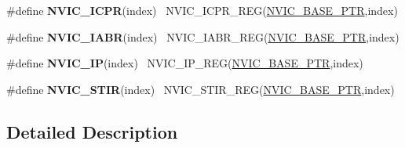 \begin{DoxyCompactItemize}
\item 
\hypertarget{group___n_v_i_c___register___accessor___macros_ga5a39e5d4659db96881c1f6de24ec47e5}{}\#define {\bfseries N\+V\+I\+C\+\_\+\+I\+C\+P\+R}(index)                                              ~N\+V\+I\+C\+\_\+\+I\+C\+P\+R\+\_\+\+R\+E\+G(\hyperlink{group___n_v_i_c___peripheral_ga28f0a055d0c218e16d1fc7b13ff0caa5}{N\+V\+I\+C\+\_\+\+B\+A\+S\+E\+\_\+\+P\+T\+R},index)\label{group___n_v_i_c___register___accessor___macros_ga5a39e5d4659db96881c1f6de24ec47e5}

\item 
\hypertarget{group___n_v_i_c___register___accessor___macros_gaf953d0f112753c05f951d7163e98e6fc}{}\#define {\bfseries N\+V\+I\+C\+\_\+\+I\+A\+B\+R}(index)                                              ~N\+V\+I\+C\+\_\+\+I\+A\+B\+R\+\_\+\+R\+E\+G(\hyperlink{group___n_v_i_c___peripheral_ga28f0a055d0c218e16d1fc7b13ff0caa5}{N\+V\+I\+C\+\_\+\+B\+A\+S\+E\+\_\+\+P\+T\+R},index)\label{group___n_v_i_c___register___accessor___macros_gaf953d0f112753c05f951d7163e98e6fc}

\item 
\hypertarget{group___n_v_i_c___register___accessor___macros_gad215e21e79fd6c4c0b310324a51b0a34}{}\#define {\bfseries N\+V\+I\+C\+\_\+\+I\+P}(index)                                                  ~N\+V\+I\+C\+\_\+\+I\+P\+\_\+\+R\+E\+G(\hyperlink{group___n_v_i_c___peripheral_ga28f0a055d0c218e16d1fc7b13ff0caa5}{N\+V\+I\+C\+\_\+\+B\+A\+S\+E\+\_\+\+P\+T\+R},index)\label{group___n_v_i_c___register___accessor___macros_gad215e21e79fd6c4c0b310324a51b0a34}

\item 
\hypertarget{group___n_v_i_c___register___accessor___macros_gab9c445f4619c4c409389ab409be52b99}{}\#define {\bfseries N\+V\+I\+C\+\_\+\+S\+T\+I\+R}(index)                                              ~N\+V\+I\+C\+\_\+\+S\+T\+I\+R\+\_\+\+R\+E\+G(\hyperlink{group___n_v_i_c___peripheral_ga28f0a055d0c218e16d1fc7b13ff0caa5}{N\+V\+I\+C\+\_\+\+B\+A\+S\+E\+\_\+\+P\+T\+R},index)\label{group___n_v_i_c___register___accessor___macros_gab9c445f4619c4c409389ab409be52b99}

\end{DoxyCompactItemize}


\subsection{Detailed Description}
